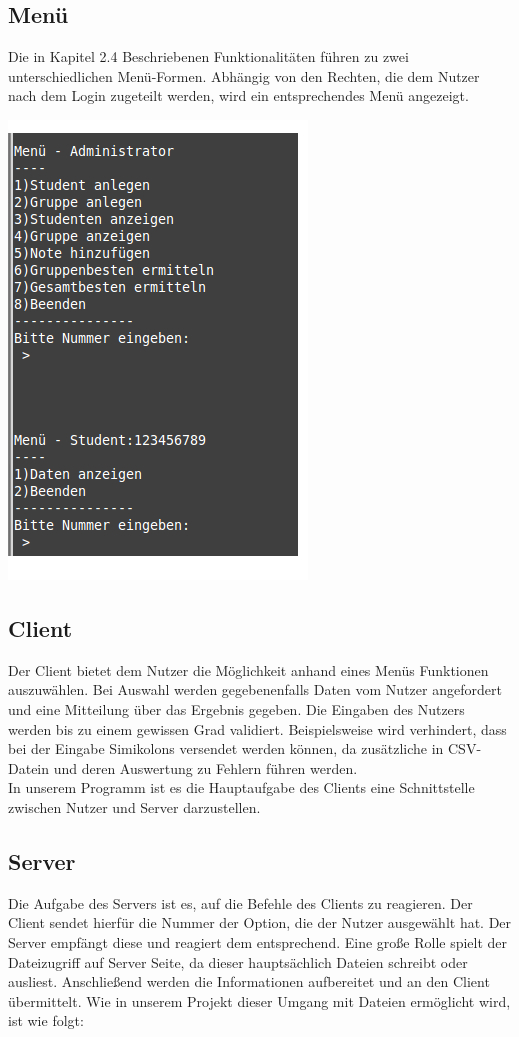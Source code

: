 \documentclass{scrartcl}
\begin{document}
	\subsection{Menü}
		Die in Kapitel 2.4 Beschriebenen Funktionalitäten führen zu zwei unterschiedlichen Menü-Formen. Abhängig von den Rechten, die dem Nutzer nach dem Login zugeteilt werden, wird ein entsprechendes Menü angezeigt. 
		\begin{center}
		\includegraphics[scale=0.6]{menue.jpg}
		\end{center}
	\subsection{Client}
		Der Client bietet dem Nutzer die Möglichkeit anhand eines Menüs Funktionen auszuwählen. Bei Auswahl werden gegebenenfalls Daten vom Nutzer angefordert und eine Mitteilung über das Ergebnis gegeben. Die Eingaben des Nutzers werden bis zu einem gewissen Grad validiert. Beispielsweise wird verhindert, dass bei der Eingabe Simikolons versendet werden können, da zusätzliche in CSV-Datein und deren Auswertung zu Fehlern führen werden.\\
		In unserem Programm ist es die Hauptaufgabe des Clients eine Schnittstelle zwischen Nutzer und Server darzustellen.
	\subsection{Server}
		Die Aufgabe des Servers ist es, auf die Befehle des Clients zu reagieren. Der Client sendet hierfür die Nummer der Option, die der Nutzer ausgewählt hat. Der Server empfängt diese und reagiert dem entsprechend. Eine große Rolle spielt der Dateizugriff auf Server Seite, da dieser hauptsächlich Dateien schreibt oder ausliest. Anschließend werden die Informationen aufbereitet und an den Client übermittelt. Wie in unserem Projekt dieser Umgang mit Dateien ermöglicht wird, ist wie folgt:
\end{document}
